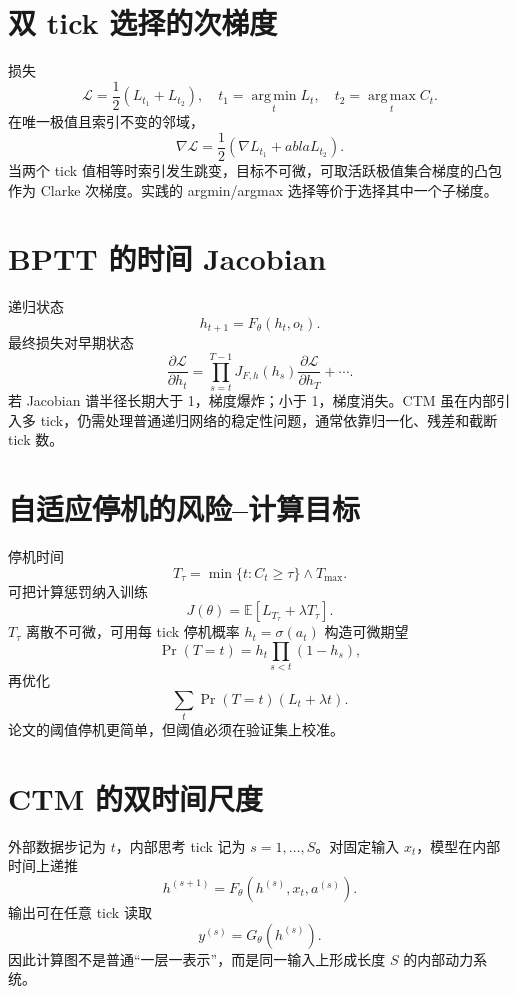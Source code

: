 \documentclass[UTF8,12pt,a4paper,fontset=none]{ctexart}
\numberwithin{equation}{section}
\newcommand{\E}{\mathbb{E}}
\newcommand{\Loss}{\mathcal{L}}
\newcommand{\argmin}{\operatorname*{arg\,min}}
\newcommand{\argmax}{\operatorname*{arg\,max}}
\begin{document}
\section{双 tick 选择的次梯度}
损失
\begin{equation}
 \Loss=\frac12(L_{t_1}+L_{t_2}),
 \quad t_1=\argmin_tL_t,
 \quad t_2=\argmax_tC_t.
\end{equation}
在唯一极值且索引不变的邻域，
\begin{equation}
 \nabla\Loss=\frac12(\nabla L_{t_1}+
abla L_{t_2}).
\end{equation}
当两个 tick 值相等时索引发生跳变，目标不可微，可取活跃极值集合梯度的凸包作为 Clarke 次梯度。实践的 argmin/argmax 选择等价于选择其中一个子梯度。

\section{BPTT 的时间 Jacobian}
递归状态
\begin{equation}
 h_{t+1}=F_\theta(h_t,o_t).
\end{equation}
最终损失对早期状态
\begin{equation}
 \frac{\partial\Loss}{\partial h_t}
 =\prod_{s=t}^{T-1}J_{F,h}(h_s)
 \frac{\partial\Loss}{\partial h_T}+\cdots.
\end{equation}
若 Jacobian 谱半径长期大于 1，梯度爆炸；小于 1，梯度消失。CTM 虽在内部引入多 tick，仍需处理普通递归网络的稳定性问题，通常依靠归一化、残差和截断 tick 数。

\section{自适应停机的风险--计算目标}
停机时间
\begin{equation}
 T_\tau=\min\{t:C_t\ge\tau\}\wedge T_{\max}.
\end{equation}
可把计算惩罚纳入训练
\begin{equation}
 J(\theta)=\E[L_{T_\tau}+\lambda T_\tau].
\end{equation}
$T_\tau$ 离散不可微，可用每 tick 停机概率 $h_t=\sigma(a_t)$ 构造可微期望
\begin{equation}
 \Pr(T=t)=h_t\prod_{s<t}(1-h_s),
\end{equation}
再优化
\begin{equation}
 \sum_t\Pr(T=t)(L_t+\lambda t).
\end{equation}
论文的阈值停机更简单，但阈值必须在验证集上校准。
\clearpage
\section{CTM 的双时间尺度}
外部数据步记为 $t$，内部思考 tick 记为 $s=1,\ldots,S$。对固定输入 $x_t$，模型在内部时间上递推
\begin{equation}
 h^{(s+1)}=F_\theta(h^{(s)},x_t,a^{(s)}).
\end{equation}
输出可在任意 tick 读取
\begin{equation}
 y^{(s)}=G_\theta(h^{(s)}).
\end{equation}
因此计算图不是普通“一层一表示”，而是同一输入上形成长度 $S$ 的内部动力系统。
\end{document}
